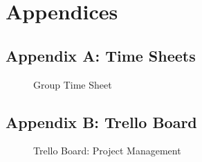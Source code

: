 \documentclass[12pt]{article} %
\begin{document}
	\section{Appendices}
	
	\subsection{Appendix A: Time Sheets}
	
	\begin{figure}[H] %
		\caption{Group Time Sheet}
		\label{fig:speciation}
	\end{figure}
	
	\newpage
	
	\subsection{Appendix B: Trello Board}
	
	
	\begin{figure}[H] %
		\caption{Trello Board: Project Management}
		\label{fig:speciation}
	\end{figure}
	
\end{document}
